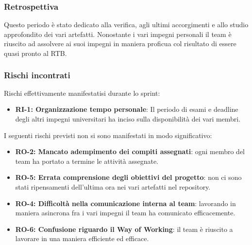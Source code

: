 \documentclass[a4paper,12pt]{article}
\begin{document}
        \subsubsection{Retrospettiva} {
            Questo periodo è stato dedicato alla verifica, agli ultimi accorgimenti e allo studio approfondito dei vari artefatti. Nonostante i vari impegni personali il team è riuscito ad assolvere ai suoi impegni in maniera proficua col risultato di essere quasi pronto al RTB.
        }

        \subsubsection{Rischi incontrati}{
            Rischi effettivamente manifestatisi durante lo sprint:
            \begin{itemize}
                \item \textbf{RI-1: Organizzazione tempo personale}: Il periodo di esami e deadline degli altri impegni universitari ha inciso sulla disponibilità dei vari membri.
                \end{itemize}
            
            I seguenti rischi previsti non si sono manifestati in modo significativo:
            \begin{itemize}
                \item \textbf{RO-2: Mancato adempimento dei compiti assegnati}: ogni membro del team ha portato a termine le attività assegnate.
                \item \textbf{RO-5: Errata comprensione degli obiettivi del progetto}: non ci sono stati ripensamenti dell'ultima ora nei vari artefatti nel repository.  
                \item \textbf{RO-4: Difficoltà nella comunicazione interna al team}: lavorando in maniera asincrona fra i vari impegni il team ha comunicato efficacemente.
                \item \textbf{RO-6: Confusione riguardo il Way of Working}: il team è riuscito a lavorare in una maniera efficiente ed efficace.
            \end{itemize}
        }
\end{document}

